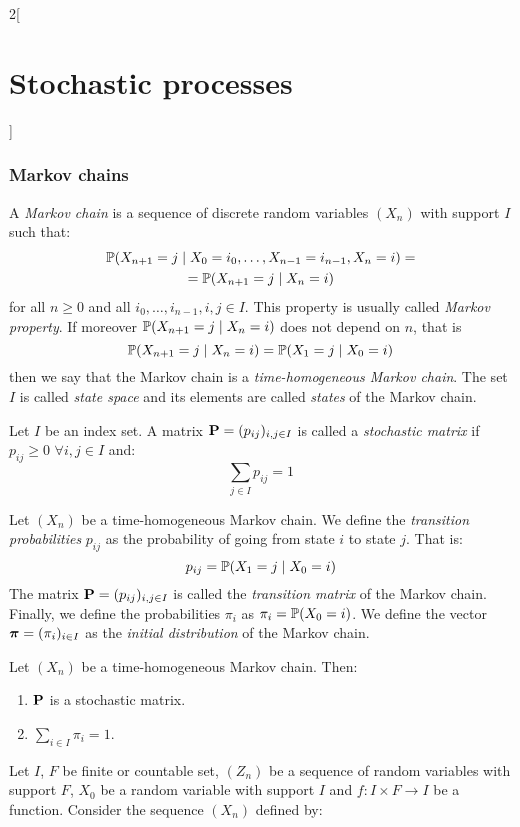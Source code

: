 \documentclass[../../../main_math.tex]{subfiles}
\begin{document}
\begin{multicols}{2}[\section{Stochastic processes}]
  \subsubsection{Markov chains}
  \begin{definition}
    A \emph{Markov chain} is a sequence of discrete random variables $(X_n)$ with support $I$ such that:
    \begin{multline*}
      \mathbb{P}(X_{n+1}=j\mid X_0=i_0,\ldots,X_{n-1}=i_{n-1},X_n=i)=\\=\mathbb{P}(X_{n+1}=j\mid X_n=i)
    \end{multline*} for all $n\geq 0$ and all $i_0,\ldots,i_{n-1},i,j\in I$. This property is usually called \emph{Markov property}.
    If moreover $\mathbb{P}(X_{n+1}=j\mid X_n=i)$ does not depend on $n$, that is
    $$\mathbb{P}(X_{n+1}=j\mid X_n=i)=\mathbb{P}(X_{1}=j\mid X_0=i)$$
    then we say that the Markov chain is a \emph{time-homogeneous Markov chain}. The set $I$ is called \emph{state space} and its elements are called \emph{states} of the Markov chain.
  \end{definition}
  \begin{definition}
    Let $I$ be an index set. A matrix $\boldsymbol{\mathrm{P}}=(p_{ij})_{i,j\in I}$ is called a \emph{stochastic matrix} if $p_{ij}\geq 0$ $\forall i,j\in I$ and: $$\sum_{j\in I}p_{ij}=1$$
  \end{definition}
  \begin{definition}
    Let $(X_n)$ be a time-homogeneous Markov chain. We define the \emph{transition probabilities} $p_{ij}$ as the probability of going from state $i$ to state $j$. That is: $$p_{ij}=\mathbb{P}(X_{1}=j\mid X_0=i)$$
    The matrix $\boldsymbol{\mathrm{P}}=(p_{ij})_{i,j\in I}$ is called the \emph{transition matrix} of the Markov chain. Finally, we define the probabilities $\pi_i$ as $\pi_i=\mathbb{P}(X_0=i)$. We define the vector $\boldsymbol{\mathrm{\pi}}=(\pi_i)_{i\in I}$ as the \emph{initial distribution} of the Markov chain.
  \end{definition}
  \begin{proposition}
    Let $(X_n)$ be a time-homogeneous Markov chain. Then:
    \begin{enumerate}
      \item $\boldsymbol{\mathrm{P}}$ is a stochastic matrix.
      \item $\sum_{i\in I}\pi_i=1$.
    \end{enumerate}
  \end{proposition}
  \begin{lemma}
    Let $I$, $F$ be finite or countable set, $(Z_n)$ be a sequence of random variables with support $F$, $X_0$ be a random variable with support $I$ and $f:I\times F\rightarrow I$ be a function. Consider the sequence $(X_n)$ defined by:

\end{lemma}
\end{multicols}
\end{document}
